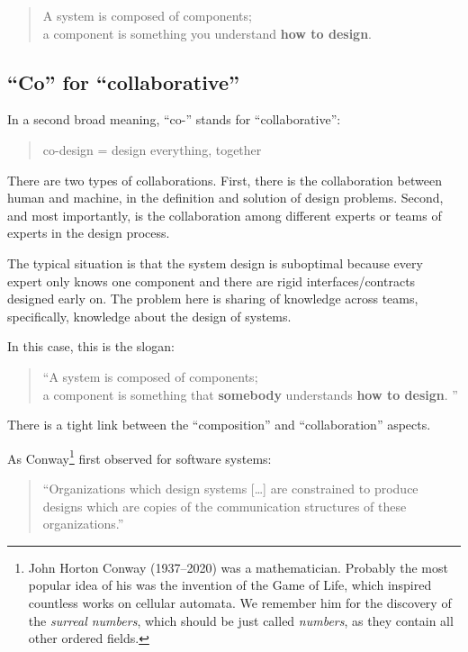 \begin{quote}
    A system is composed of components;\\
    a component is something you understand
    \textbf{how to design}.
\end{quote}

\subsection{``Co'' for ``collaborative''}

In a second broad meaning, ``co-'' stands for ``collaborative'':

\begin{quote}
    co-design = design everything, together
\end{quote}

There are two types of collaborations.
First, there is the collaboration between human and machine, in the definition and solution of design problems.
Second, and most importantly, is the collaboration among different experts or teams of experts in the design process.

The typical situation is that the system design is suboptimal because every expert only knows one component and there are rigid interfaces/contracts designed early on.
The problem here is sharing of knowledge across teams, specifically, knowledge about the design of systems.

In this case, this is the slogan:

\begin{quote}
    \enquote{A system is composed of components;\\
        a component is something that \textbf{somebody} understands
        \textbf{how to design}.
    }
\end{quote}

There is a tight link between the ``composition'' and ``collaboration'' aspects.

As Conway\footnote{John Horton Conway (1937--2020) was a mathematician.
    Probably the most popular idea of his was the invention of the Game of Life, which inspired countless works on cellular automata.
    We remember him for the discovery of the \emph{surreal numbers}, which should be just called \emph{numbers}, as they contain all other ordered fields.
} first observed for software systems:

\begin{quote}
    \enquote{Organizations which design systems [\dots] are constrained to produce designs which are copies of the communication structures of these organizations.}
\end{quote}

